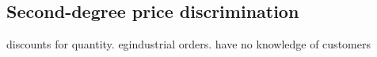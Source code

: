 
\subsection{Second-degree price discrimination}

discounts for quantity.
egindustrial orders. have no knowledge of customers

